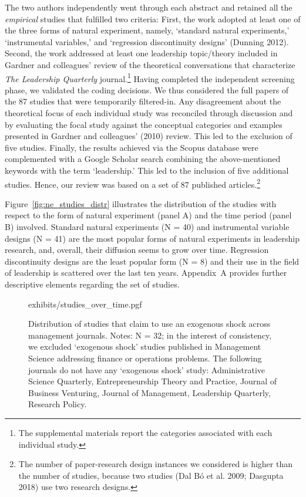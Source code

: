 \begin{refsection}
The two authors independently went through each abstract and retained all the
\emph{empirical} studies that fulfilled two criteria: First, the work adopted at
least one of the three forms of natural experiment, namely, `standard natural
experiments,' `instrumental variables,' and `regression discontinuity designs'
(Dunning 2012). Second, the work addressed at least one leadership topic/theory
included in Gardner and colleagues' review of the theoretical conversations that
characterize \emph{The Leadership Quarterly} journal.\footnote{The supplemental
materials report the categories associated with each individual study.} Having
completed the independent screening phase, we validated the coding decisions. We
thus considered the full papers of the 87 studies that were temporarily
filtered-in. Any disagreement about the theoretical focus of each individual
study was reconciled through discussion and by evaluating the focal study
against the conceptual categories and examples presented in Gardner and
colleagues' (2010) review. This led to the exclusion of five studies. Finally,
the results achieved via the Scopus database were complemented with a Google
Scholar search combining the above-mentioned keywords with the term
`leadership.' This led to the inclusion of five additional studies.  Hence, our
review was based on a set of 87 published articles.\footnote{The number of
	paper-research design instances we considered is higher than the number
of studies, because two studies (Dal Bó et al. 2009; Dasgupta 2018) use two
research designs.}

Figure~\ref{fig:ne_studies_distr} illustrates the distribution of the
studies with respect to the form of natural experiment (panel A) and the time
period (panel B) involved. Standard natural experiments (N = 40) and
instrumental variable designs (N = 41) are the most popular forms of natural
experiments in leadership research, and, overall, their diffusion seems to grow
over time. Regression discontinuity designs are the least popular form (N = 8)
and their use in the field of leadership is scattered over the last ten years.
Appendix~A provides further descriptive elements regarding the set of studies.



\begin{figure}[!htbp]
    \centering
    {exhibits/studies_over_time.pgf}
    \caption{Distribution of studies that claim to use an exogenous shock across
    management journals.  Notes: N = 32; in the interest of consistency, we
    excluded `exogenous shock' studies published in Management Science addressing
    finance or operations problems. The following journals do not have any
    `exogenous shock' study: Administrative Science Quarterly, Entrepreneurship
    Theory and Practice, Journal of Business Venturing, Journal of Management,
    Leadership Quarterly, Research Policy.}
    \label{fig:studies_across_journals}
\end{figure}         




\end{refsection}
